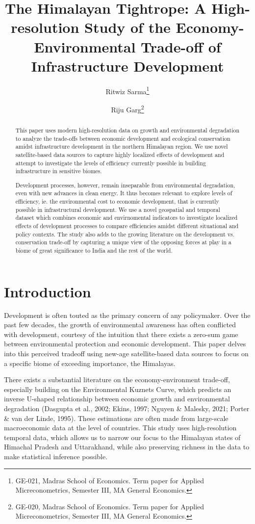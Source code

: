 \documentclass{article}
\title{The Himalayan Tightrope: A High-resolution Study of the Economy-Environmental Trade-off of Infrastructure Development}
\author{Ritwiz Sarma\footnote{GE-021, Madras School of Economics. Term paper for Applied Micreconometrics, Semester III, MA General Economics.} \and Riju Garg\footnote{GE-020, Madras School of Economics. Term paper for Applied Micreconometrics, Semester III, MA General Economics.}}
\begin{document}
\maketitle

\begin{abstract}

    This paper uses modern high-resolution data on growth and environmental degradation to analyze the trade-offs between economic development and ecological conservation amidst infrastructure development in the northern Himalayan region. We use novel satellite-based data sources to capture highly localized effects of development and attempt to investigate the levels of efficiency currently possible in building infrastructure in sensitive biomes.

    Development processes, however, remain inseparable from environmental degradation, even with new advances in clean energy. It thus becomes relevant to explore levels of efficiency, ie. the environmental cost to economic development, that is currently possible in infrastructural development. We use a novel geospatial and temporal dataset which combines economic and envirnomental indicators to investigate localized effects of development processes to compare efficiencies amidst different situational and policy contexts. The study also adds to the growing literature on the development vs. conservation trade-off by capturing a unique view of the opposing forces at play in a biome of great significance to India and the rest of the world.

\end{abstract}


\section{Introduction}

Development is often touted as the primary concern of any policymaker.  Over the past few decades, the growth of environmental awareness has often conflicted with development, courtesy of the intuition that there exists a zero-sum game between environmental protection and economic development. This paper delves into this perceived tradeoff using new-age satellite-based data sources to focus on a specific biome of exceeding importance, the Himalayas.

There exists a substantial literature on the economy-environment trade-off, especially building on the Environmental Kuznets Curve, which predicts an inverse U-shaped relationship between economic growth and environmental degradation (Dasgupta et al., 2002; Ekins, 1997; Nguyen \& Malesky, 2021; Porter \& van der Linde, 1995). These estimations are often made from large-scale macroeconomic data at the level of countries. This study uses high-resolution temporal data, which allows us to narrow our focus to the Himalayan states of Himachal Pradesh and Uttarakhand, while also preserving richness in the data to make statistical inference possible. 
\end{document}
